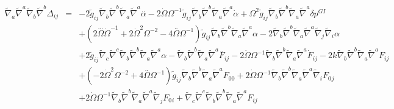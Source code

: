 \documentclass[10pt,letterpaper]{article}
\numberwithin{equation}{section}
\begin{document}
\begin{appendices}
\begin{eqnarray}
\tilde\nabla_a\tilde\nabla^a \tilde\nabla_b\tilde\nabla^b \Delta_{ij}&=& -2 \tilde{g}_{ij} \tilde{\nabla}_{b}\tilde{\nabla}^{b}\tilde{\nabla}_{a}\tilde{\nabla}^{a}\overset{..}{\alpha} - 2 \dot{\Omega} \Omega^{-1} \tilde{g}_{ij} \tilde{\nabla}_{b}\tilde{\nabla}^{b}\tilde{\nabla}_{a}\tilde{\nabla}^{a}\dot{\alpha} + \Omega^2 \tilde{g}_{ij} \tilde{\nabla}_{b}\tilde{\nabla}^{b}\tilde{\nabla}_{a}\tilde{\nabla}^{a}\delta p^{GI}{} \nonumber \\ 
&& + (2 \overset{...}{\Omega} \dot{\Omega}^{-1} + 2 \dot{\Omega}^2 \Omega^{-2} - 4 \overset{..}{\Omega} \Omega^{-1}) \tilde{g}_{ij} \tilde{\nabla}_{b}\tilde{\nabla}^{b}\tilde{\nabla}_{a}\tilde{\nabla}^{a}\alpha - 2 \tilde{\nabla}_{b}\tilde{\nabla}^{b}\tilde{\nabla}_{a}\tilde{\nabla}^{a}\tilde{\nabla}_{j}\tilde{\nabla}_{i}\alpha \nonumber \\ 
&& + 2 \tilde{g}_{ij} \tilde{\nabla}_{c}\tilde{\nabla}^{c}\tilde{\nabla}_{b}\tilde{\nabla}^{b}\tilde{\nabla}_{a}\tilde{\nabla}^{a}\alpha - \tilde{\nabla}_{b}\tilde{\nabla}^{b}\tilde{\nabla}_{a}\tilde{\nabla}^{a}\overset{..}{F}_{ij} - 2 \dot{\Omega} \Omega^{-1} \tilde{\nabla}_{b}\tilde{\nabla}^{b}\tilde{\nabla}_{a}\tilde{\nabla}^{a}\dot{F}_{ij} - 2 k \tilde{\nabla}_{b}\tilde{\nabla}^{b}\tilde{\nabla}_{a}\tilde{\nabla}^{a}F_{ij} \nonumber \\ 
&& + (-2 \dot{\Omega}^2 \Omega^{-2} + 4 \overset{..}{\Omega} \Omega^{-1}) \tilde{g}_{ij} \tilde{\nabla}_{b}\tilde{\nabla}^{b}\tilde{\nabla}_{a}\tilde{\nabla}^{a}F_{00}{} + 2 \dot{\Omega} \Omega^{-1} \tilde{\nabla}_{b}\tilde{\nabla}^{b}\tilde{\nabla}_{a}\tilde{\nabla}^{a}\tilde{\nabla}_{i}F_{0}{}_{j} \nonumber \\ 
&& + 2 \dot{\Omega} \Omega^{-1} \tilde{\nabla}_{b}\tilde{\nabla}^{b}\tilde{\nabla}_{a}\tilde{\nabla}^{a}\tilde{\nabla}_{j}F_{0}{}_{i} + \tilde{\nabla}_{c}\tilde{\nabla}^{c}\tilde{\nabla}_{b}\tilde{\nabla}^{b}\tilde{\nabla}_{a}\tilde{\nabla}^{a}F_{ij}
\end{eqnarray}


\end{appendices}
\end{document}

